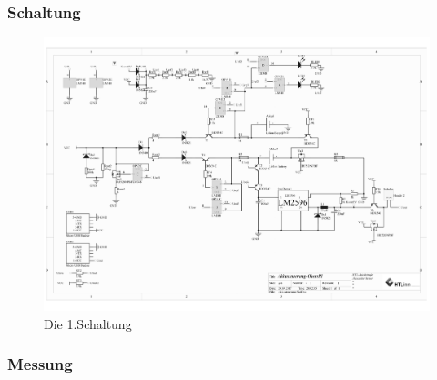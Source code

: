 \documentclass[12pt,a4paper]{article}
\begin{document}
\subsubsection{Schaltung}
\label{SUBSUBSEC:CIRCUIT-1}
\begin{figure}[H]
  \centering
		\includegraphics[scale=0.7, angle=90]{graphics/20170920-Shematic.pdf}
		\caption{Die 1.Schaltung}
		\label{fig:circuit1}
\end{figure}

\newpage
\subsubsection{Messung}
\label{SUBSUBSEC:MEASUREMENT1}
\end{document}
